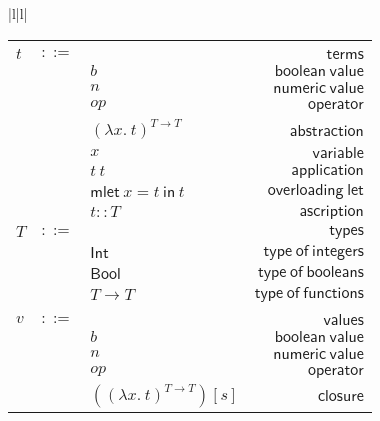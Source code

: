 \documentclass[preprint,authoryear,sort&compress,9pt,nocopyrightspace]{article}
\newcommand{\conf}[2][s]{(#2)[#1]}
\newcommand{\ascrip}[1]{#1::T}
\newcommand{\oletP}[3]{\mathsf{mlet} \ x = #2 \ \mathsf{in}  \ #3}
\newcommand{\app}[2]{#1 \ #2}
\newcommand{\negacion}[1]{\mathsf{not} \ #1}
\newcommand{\suma}[1]{\mathsf{add1} \ #1}
\newcommand{\absSTT}[2]{(\lambda #1. \ #2)^{T \to T}}
\newcommand{\truet}{\mathsf{true}}
\newcommand{\falset}{\mathsf{false}}
\newcommand{\boolt}{\mathsf{Bool}}
\newcommand{\intt}{\mathsf{Int}}
\begin{document}
\begin{figure}
\begin{small}
\begin{center}
\hspace*{-2cm}
\begin{tabular}{|l|l|}
\hline
\begin{tabular}{l c l r}
&&&\\
$t$&$::=$&&$\mathsf {terms}$\\
&&$b$&$\mathsf {boolean \ value}$\\
&&$n$&$\mathsf {numeric \ value}$\\
&&$op$&$\mathsf{operator}$\\
&&$\absSTT {x}{t}$&\ $\mathsf {abstraction}$\\
&&$x$&$\mathsf {variable}$\\
&&$\app {t}{t}$&$\mathsf {application}$\\
&&$\oletP{T}{t}{t}$&$\mathsf {overloading \ let}$\\
&&$\ascrip {t}$&$\mathsf {ascription}$\\
$T$&$::=$&&$\mathsf {types}$\\
&&$\intt$&$\mathsf {type \ of \ integers}$\\
&&$\boolt$&$\mathsf {type \ of \ booleans}$\\
&&$T \to T$&$\mathsf {type \ of \ functions}$\\
&&&\\
$v$&$::=$&&$\mathsf {values}$\\
&&$b$&$\mathsf {boolean \ value}$\\
&&$n$&$\mathsf{numeric \ value} $\\
&&$op$&$\mathsf{operator}$\\
&&$\conf{\absSTT {x}{t}}$&$\mathsf{closure}$\\


\end{tabular}
\end{tabular}
\end{center}
\end{small}
\end{figure}
\end{document}
